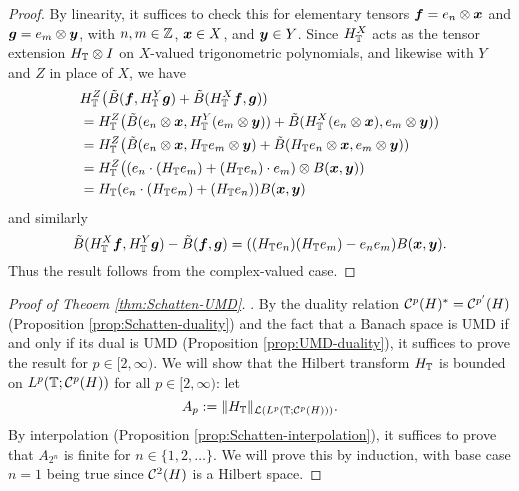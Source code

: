 \begin{proof}
  By linearity, it suffices to check this for elementary tensors $\bm{f} = e_{n} \otimes \bm{x}$ and $\bm{g} = e_{m} \otimes \bm{y}$, with $n,m \in \mathbb{Z}$, $\bm{x} \in X$, and $\bm{y} \in Y$.
  Since $H_{\mathbb{T}}^{X}$ acts as the tensor extension $H_{\mathbb{T}} \otimes I$ on $X$-valued trigonometric polynomials, and likewise with $Y$ and $Z$ in place of $X$, we have
  \begin{equation*}
    \begin{aligned}
      &H_{\mathbb{T}}^{Z}\big(\tilde{B}(\bm{f}, H_{\mathbb{T}}^{Y} \bm{g}) + \tilde{B}(H_{\mathbb{T}}^{X} \bm{f}, \bm{g})) \\
      &= H_{\mathbb{T}}^{Z} \big( \tilde{B}(e_{n} \otimes \bm{x}, H_{\mathbb{T}}^{Y} (e_{m} \otimes \bm{y}) ) + \tilde{B}(H_{\mathbb{T}}^{X} (e_{n} \otimes \bm{x}), e_{m} \otimes \bm{y})) \\
      &= H_{\mathbb{T}}^{Z} \big( \tilde{B}(e_{n} \otimes \bm{x}, H_{\mathbb{T}} e_{m} \otimes \bm{y} ) + \tilde{B}(H_{\mathbb{T}} e_{n} \otimes \bm{x}, e_{m} \otimes \bm{y})) \\
      &= H_{\mathbb{T}}^{Z} \big( (e_{n} \cdot (H_{\mathbb{T}} e_{m}) + (H_{\mathbb{T}} e_{n}) \cdot e_{m} )\otimes B(\bm{x},  \bm{y})) \\
      &= H_{\mathbb{T}}(e_{n} \cdot (H_{\mathbb{T}} e_{m}) + (H_{\mathbb{T}} e_{n})) B(\bm{x}, \bm{y})
    \end{aligned}
  \end{equation*}
  and similarly
  \begin{equation*}
    \tilde{B}(H_{\mathbb{T}}^{X} \bm{f}, H_{\mathbb{T}}^{Y} \bm{g}) - \tilde{B}(\bm{f}, \bm{g})
    = ((H_{\mathbb{T}} e_n)(H_{\mathbb{T}} e_m) - e_n e_m) B(\bm{x},\bm{y}).
  \end{equation*}
  Thus the result follows from the complex-valued case.
\end{proof}

\begin{proof}[Proof of Theoem \ref{thm:Schatten-UMD}].
  By the duality relation $\mathcal{C}^{p}(H)^* = \mathcal{C}^{p'}(H)$ (Proposition \ref{prop:Schatten-duality}) and the fact that a Banach space is UMD if and only if its dual is UMD (Proposition \ref{prop:UMD-duality}), it suffices to prove the result for $p \in [2,\infty)$.
  We will show that the Hilbert transform $H_{\mathbb{T}}$ is bounded on $L^p(\mathbb{T};\mathcal{C}^{p}(H))$ for all $p \in [2,\infty)$: let
  \begin{equation*}
    A_{p} := \|H_{\mathbb{T}}\|_{\mathcal{L}(L^p(\mathbb{T};\mathcal{C}^{p}(H)))}.
  \end{equation*}
  By interpolation (Proposition \ref{prop:Schatten-interpolation}), it suffices to prove that $A_{2^{n}}$ is finite for $n \in \{1,2,\ldots\}$.
  We will prove this by induction, with base case $n=1$ being true since $\mathcal{C}^{2}(H)$ is a Hilbert space.

\end{proof}

